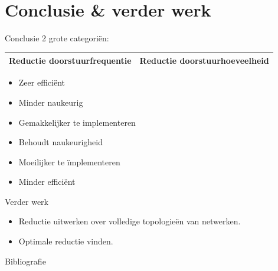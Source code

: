\documentclass[presentation, bigger]{beamer}
\begin{document}
\section{Conclusie \& verder werk}
\begin{frame}{Conclusie}
  2 grote categoriën:
  \vspace{1cm}
  \begin{tabular}{ p{5.5cm}  p{5.5cm} }
    \toprule
    Reductie doorstuurfrequentie & Reductie doorstuurhoeveelheid   \\ 
    \toprule
  \end{tabular}    

  \begin{minipage}{.5\textwidth}
    \begin{itemize}
    \item Zeer efficiënt
    \item Minder naukeurig
    \item Gemakkelijker te implementeren
    \end{itemize}
    
  \end{minipage}%
  \begin{minipage}{.5\textwidth}
    \begin{itemize}
    \item Behoudt naukeurigheid
    \item Moeilijker te ïmplementeren
    \item Minder efficiënt
    \end{itemize}
  \end{minipage}
  \vspace{2cm}
  \hspace{2.5cm}
\end{frame}

\begin{frame}{Verder werk}
  \begin{itemize}
  \item Reductie uitwerken over volledige topologieën van netwerken.
  \item Optimale reductie vinden.
  \end{itemize}
\end{frame}

\begin{frame}[allowframebreaks]{Bibliografie}

  \nocite{*}
  \printbibliography
\end{frame}
\end{document}

